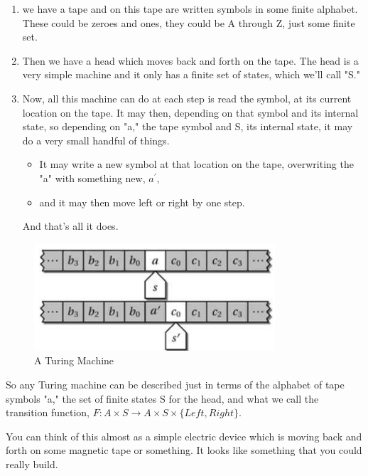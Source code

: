 \documentclass[]{article}
\begin{document}
\begin{enumerate}
	\item we have a tape and on this tape are written symbols in some finite alphabet. These could be zeroes and ones, they could be A through Z, just some finite set.

	\item Then we have a head which moves back and forth on the tape. The head is a very simple machine and it only has a finite set of states, which we'll call "S."
	
	\item Now, all this machine can do at each step is read the symbol, at its current location on the tape. 	It may then, depending on that symbol 	and its internal state, 	so depending on "a," the tape symbol 	and S, its internal state, 	it may do a very small handful of things.
	
\begin{itemize}
	\item 	It may 	write a new symbol 	at that location on the tape,
	overwriting the "a" with something new, $a^\prime$,
	\item and it may then move 	left or right by one step.
\end{itemize}
	And that's all it does.
\end{enumerate}


\begin{figure}[H]
	\begin{center}
		\caption{A Turing Machine}\label{fig:TuringMachine}
		\includegraphics[width=0.8\textwidth]{TuringMachine}
	\end{center}
\end{figure}

So any Turing machine
can be described
just in terms of
the alphabet of tape symbols "a,"
the set of finite states S
for the head,
and what we call the
transition function,
$F: A \times S \rightarrow A \times S \times \{Left,Right\}$.

You can think of this almost as a simple electric device which is moving back and forth
on some magnetic tape or something. It looks like something that you could really build.
\end{document}
